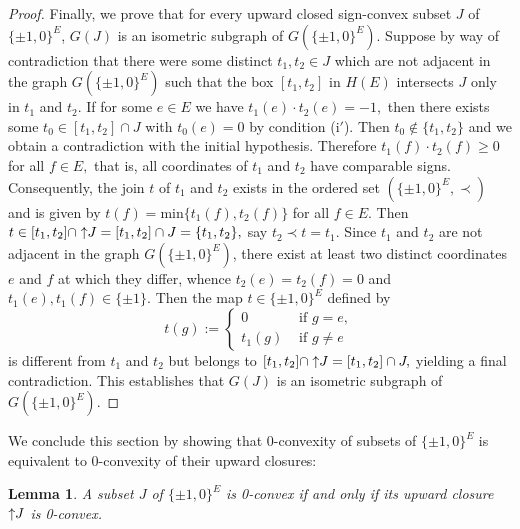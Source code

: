 \documentclass[11pt,a4paper]{amsart}
\newtheorem{lemma}{Lemma}
\theoremstyle{definition}
\numberwithin{equation}{section}
\newcommand{\HH}{\ensuremath{H}}
\newcommand{\hcovectors}{J}
\begin{document}
\begin{proof}
Finally, we prove that for every upward closed sign-convex subset $\hcovectors$ of $\{ \pm 1,0\}^E$,  $G(\hcovectors)$ is an isometric subgraph of  $G(\{ \pm 1, 0\}^E)$. Suppose by way of contradiction that there were some distinct $t_1,t_2\in\hcovectors$ which are not adjacent in the
graph $G(\{ \pm 1,0\}^E)$ such that the box $[t_1,t_2]$ in $\HH(E)$ intersects $\hcovectors$ only in $t_1$ and $t_2.$ If for some $e\in E$ we have $t_1(e)\cdot t_2(e)=-1,$ then there exists some $t_0\in [t_1,t_2]\cap\hcovectors$ with $t_0(e)=0$ by condition {\rm(i$'$)}. Then $t_0\notin \{ t_1,t_2\}$ and we obtain a contradiction with the initial hypothesis. Therefore $t_1(f)\cdot t_2(f)\ge 0$ for all $f\in E,$ that is, all coordinates of $t_1$ and $t_2$ have comparable signs. Consequently,
the join $t$ of $t_1$ and $t_2$ exists in the ordered set $(\{ \pm 1,0\}^E,\prec)$ and is given by $t(f)=\mbox{min}\{ t_1(f),t_2(f)\}$ for all $f\in E.$ Then
$t\in [t_1,t_2]\cap \uparrow\hspace*{-0.1cm}\hcovectors=[t_1,t_2]\cap \hcovectors=\{ t_1,t_2\},$ say $t_2\prec t=t_1.$ Since $t_1$ and $t_2$ are not adjacent in the graph $G(\{ \pm 1,0\}^E)$, there exist at least two distinct coordinates $e$ and $f$ at which they differ, whence $t_2(e)=t_2(f)=0$ and $t_1(e),t_1(f)\in \{ \pm 1\}.$ Then the map $t\in \{ \pm 1, 0\}^E$ defined by
$$
t(g):=\begin{cases}
0 &\mbox{ if } g=e,\\
t_1(g) &\mbox{ if } g\ne e
\end{cases}
$$
is different from $t_1$ and $t_2$ but belongs to $[t_1,t_2]\cap \uparrow\hspace*{-0.1cm}\hcovectors=[t_1,t_2]\cap \hcovectors,$ yielding a final contradiction. This establishes that  $G(\hcovectors)$ is an isometric subgraph of $G(\{ \pm 1, 0\}^E)$.
\end{proof}

We conclude this section by showing that 0-convexity of subsets of $\{ \pm 1, 0\}^E$ is equivalent to 0-convexity of their upward closures:

\begin{lemma} \label{SCA-upper-closure} A subset $\hcovectors$ of $\{ \pm 1, 0\}^E$ is 0-convex if and only if its upward closure  $\uparrow\hspace*{-0.1cm}\hcovectors$ is 0-convex.
\end{lemma}
\end{document}
